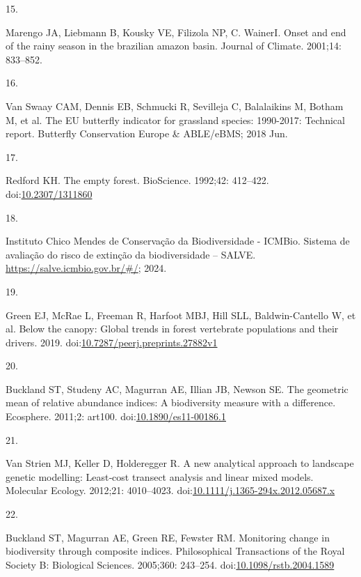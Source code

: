 \documentclass[
  letterpaper,
]{scrbook}
\newlength{\cslhangindent}
\newlength{\csllabelwidth}
\newenvironment{CSLReferences}[2] %
 {\begin{list}{}{%
  \setlength{\itemindent}{0pt}
  \setlength{\leftmargin}{0pt}
  \setlength{\parsep}{0pt}
  \ifodd #1
   \setlength{\leftmargin}{\cslhangindent}
   \setlength{\itemindent}{-1\cslhangindent}
  \fi
  \setlength{\itemsep}{#2\baselineskip}}}
 {\end{list}}
\newcommand{\CSLLeftMargin}[1]{\parbox[t]{\csllabelwidth}{\strut#1\strut}}
\newcommand{\CSLRightInline}[1]{\parbox[t]{\linewidth - \csllabelwidth}{\strut#1\strut}}
\begin{document}
\begin{CSLReferences}{0}{1}
\CSLLeftMargin{15. }%
\CSLRightInline{Marengo JA, Liebmann B, Kousky VE, Filizola NP, C.
WainerI. Onset and end of the rainy season in the brazilian amazon
basin. Journal of Climate. 2001;14: 833--852. }

\CSLLeftMargin{16. }%
\CSLRightInline{Van Swaay CAM, Dennis EB, Schmucki R, Sevilleja C,
Balalaikins M, Botham M, et al. The EU butterfly indicator for grassland
species: 1990-2017: Technical report. Butterfly Conservation Europe \&
ABLE/eBMS; 2018 Jun. }

\CSLLeftMargin{17. }%
\CSLRightInline{Redford KH. The empty forest. BioScience. 1992;42:
412--422. doi:\href{https://doi.org/10.2307/1311860}{10.2307/1311860}}

\CSLLeftMargin{18. }%
\CSLRightInline{Instituto Chico Mendes de Conservação da Biodiversidade
- ICMBio. Sistema de avaliação do risco de extinção da biodiversidade --
SALVE. \url{https://salve.icmbio.gov.br/\#/}; 2024. }

\CSLLeftMargin{19. }%
\CSLRightInline{Green EJ, McRae L, Freeman R, Harfoot MBJ, Hill SLL,
Baldwin-Cantello W, et al. Below the canopy: Global trends in forest
vertebrate populations and their drivers. 2019.
doi:\href{https://doi.org/10.7287/peerj.preprints.27882v1}{10.7287/peerj.preprints.27882v1}}

\CSLLeftMargin{20. }%
\CSLRightInline{Buckland ST, Studeny AC, Magurran AE, Illian JB, Newson
SE. The geometric mean of relative abundance indices: A biodiversity
measure with a difference. Ecosphere. 2011;2: art100.
doi:\href{https://doi.org/10.1890/es11-00186.1}{10.1890/es11-00186.1}}

\CSLLeftMargin{21. }%
\CSLRightInline{Van Strien MJ, Keller D, Holderegger R. A new analytical
approach to landscape genetic modelling: Least‐cost transect analysis
and linear mixed models. Molecular Ecology. 2012;21: 4010--4023.
doi:\href{https://doi.org/10.1111/j.1365-294x.2012.05687.x}{10.1111/j.1365-294x.2012.05687.x}}

\CSLLeftMargin{22. }%
\CSLRightInline{Buckland ST, Magurran AE, Green RE, Fewster RM.
Monitoring change in biodiversity through composite indices.
Philosophical Transactions of the Royal Society B: Biological Sciences.
2005;360: 243--254.
doi:\href{https://doi.org/10.1098/rstb.2004.1589}{10.1098/rstb.2004.1589}}

\end{CSLReferences}
\end{document}
